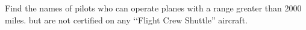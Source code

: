 Find the names of pilots who can operate planes with a range greater than 2000 miles.
but are not certified on any \lq\lq Flight Crew Shuttle'' aircraft.
